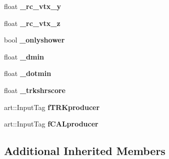 \begin{DoxyCompactItemize}
\item 
\hypertarget{classselection_1_1Pi0Selection_ad2780ab5a41ec2b9658027466dcb1a61}{float {\bfseries \-\_\-rc\-\_\-vtx\-\_\-y}}\label{classselection_1_1Pi0Selection_ad2780ab5a41ec2b9658027466dcb1a61}

\item 
\hypertarget{classselection_1_1Pi0Selection_a9d468d7b86c7ce10cfe506d83ba0bc2b}{float {\bfseries \-\_\-rc\-\_\-vtx\-\_\-z}}\label{classselection_1_1Pi0Selection_a9d468d7b86c7ce10cfe506d83ba0bc2b}

\item 
\hypertarget{classselection_1_1Pi0Selection_afe28c10248c1e8422bfe433798632f5b}{bool {\bfseries \-\_\-onlyshower}}\label{classselection_1_1Pi0Selection_afe28c10248c1e8422bfe433798632f5b}

\item 
\hypertarget{classselection_1_1Pi0Selection_a024f58d2a5b862ea9933dbca74afcb0e}{float {\bfseries \-\_\-dmin}}\label{classselection_1_1Pi0Selection_a024f58d2a5b862ea9933dbca74afcb0e}

\item 
\hypertarget{classselection_1_1Pi0Selection_abfd819e3214069b1b5efa2bf88e96f5d}{float {\bfseries \-\_\-dotmin}}\label{classselection_1_1Pi0Selection_abfd819e3214069b1b5efa2bf88e96f5d}

\item 
\hypertarget{classselection_1_1Pi0Selection_aa74075888ad93d414dea65eb0ff02dc3}{float {\bfseries \-\_\-trkshrscore}}\label{classselection_1_1Pi0Selection_aa74075888ad93d414dea65eb0ff02dc3}

\item 
\hypertarget{classselection_1_1Pi0Selection_aa8b9b496faee370de5f3682369a32950}{art\-::\-Input\-Tag {\bfseries f\-T\-R\-Kproducer}}\label{classselection_1_1Pi0Selection_aa8b9b496faee370de5f3682369a32950}

\item 
\hypertarget{classselection_1_1Pi0Selection_a5bee48abbfcd4c25ce387740f193a5a3}{art\-::\-Input\-Tag {\bfseries f\-C\-A\-Lproducer}}\label{classselection_1_1Pi0Selection_a5bee48abbfcd4c25ce387740f193a5a3}

\end{DoxyCompactItemize}
\subsection*{Additional Inherited Members}


